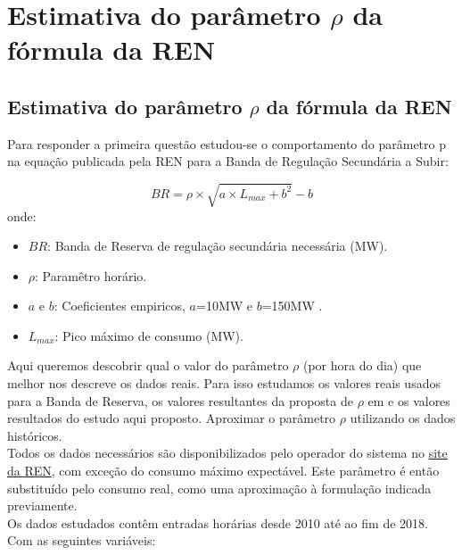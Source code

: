 \part{Estimativa do parâmetro $\rho$ da fórmula da REN}

\chapter{Estimativa do parâmetro $\rho$ da fórmula da REN}

Para responder a primeira questão estudou-se o comportamento do parâmetro p na equação publicada pela \gls{REN} para a Banda de Regulação Secundária a Subir:

\begin{equation} \label{eq:BRREN} 
    BR = \rho \times \sqrt{a \times  L_{max} + b^{2}} - b 
\end{equation}
onde:
\begin{itemize}
  \item $BR$: Banda de Reserva  de regulação secundária necessária (MW).
  \item $\rho$: Paramêtro horário.
  \item $a$ e $b$: Coeficientes empiricos, $a$=10MW e $b$=150MW .
  \item $L_{max}$: Pico máximo de consumo (MW).
\end{itemize}

Aqui queremos descobrir qual o valor do parâmetro $\rho$ (por hora do dia) que melhor nos descreve os dados reais. Para isso estudamos os valores reais usados para a Banda de Reserva, os valores resultantes da proposta de $\rho$  em \cite{Carneiro2016} e os valores resultados do estudo aqui proposto. Aproximar o parâmetro $\rho$  utilizando os dados históricos. \\
Todos os dados necessários são disponibilizados pelo operador do sistema no \href{https://mercado.ren.pt/PT/Electr}{site da \gls{REN}}, com exceção do consumo máximo expectável. Este parâmetro é então substituído pelo consumo real, como uma aproximação à formulação indicada previamente.\\
Os dados estudados contêm entradas horárias desde 2010 até ao fim de 2018. Com as seguintes variáveis:\\

\begin{table}[H] \centering \caption{Dados REN}  \end{table}

